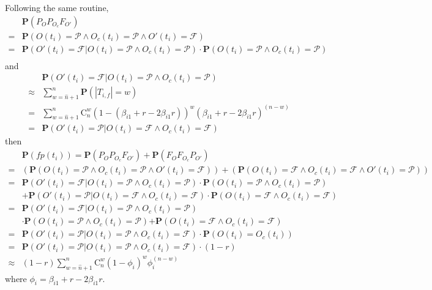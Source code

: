 Following the same routine,
\begin{equation}
\begin{aligned}
& \mathbf{P}(P_O P_{O_c} F_{O'}) \\
= & \mathbf{P}(O(t_i) = \mathcal{P} \wedge O_c(t_i) = \mathcal{P} \wedge O'(t_i) = \mathcal{F}) \\
= & \mathbf{P}(O'(t_i) = \mathcal{F} | O(t_i) = \mathcal{P} \wedge O_c(t_i) = \mathcal{P}) \cdot \mathbf{P}(O(t_i) = \mathcal{P} \wedge O_c(t_i) = \mathcal{P}) \\  
\end{aligned}
\end{equation}
and
\begin{equation}
\begin{aligned}
& \mathbf{P}(O'(t_i) = \mathcal{F} | O(t_i) = \mathcal{P} \wedge O_c(t_i) = \mathcal{P}) \\
\approx & \sum_{w = \hat{n} + 1}^{n}{\mathbf{P}(|T_{i,f}| = w)} \\
= & \sum_{w = \hat{n} + 1}^{n}
{  \mathrm{C}_n^w{(1 - (\beta_{i1} + r - 2\beta_{i1} r))^w}  }
{  (\beta_{i1} + r - 2\beta_{i1} r)^{(n-w)}  } \\
= & \mathbf{P}(O'(t_i) = \mathcal{P} | O(t_i) = \mathcal{F} \wedge O_c(t_i) = \mathcal{F})
\end{aligned}
\end{equation}
then
\begin{equation}
\begin{aligned}
& \mathbf{P}(fp(t_i))= \mathbf{P}(P_O P_{O_c} F_{O'}) + \mathbf{P}(F_O F_{O_c} P_{O'}) \\
= & (\mathbf{P}(O(t_i) = \mathcal{P} \wedge O_c(t_i) = \mathcal{P} \wedge O'(t_i) = \mathcal{F})) 
 + (\mathbf{P}(O(t_i) = \mathcal{F} \wedge O_c(t_i) = \mathcal{F} \wedge O'(t_i) = \mathcal{P})) \\
= & \mathbf{P}(O'(t_i) = \mathcal{F} | O(t_i) = \mathcal{P} \wedge O_c(t_i) = \mathcal{P}) \cdot \mathbf{P}(O(t_i) = \mathcal{P} \wedge O_c(t_i) = \mathcal{P}) \\
& + \mathbf{P}(O'(t_i) = \mathcal{P} | O(t_i) = \mathcal{F} \wedge O_c(t_i) = \mathcal{F}) \cdot \mathbf{P}(O(t_i) = \mathcal{F} \wedge O_c(t_i) = \mathcal{F}) \\
= & \mathbf{P}(O'(t_i) = \mathcal{F} | O(t_i) = \mathcal{P} \wedge O_c(t_i) = \mathcal{P}) \\
& \cdot{\mathbf{P}(O(t_i) = \mathcal{P} \wedge O_c(t_i) = \mathcal{P})}{ +\mathbf{P}(O(t_i) = \mathcal{F} \wedge O_c(t_i) = \mathcal{F})} \\
= & \mathbf{P}(O'(t_i) = \mathcal{P} | O(t_i) = \mathcal{P} \wedge O_c(t_i) = \mathcal{F}) \cdot \mathbf{P}(O(t_i) = O_c(t_i)) \\
= & \mathbf{P}(O'(t_i) = \mathcal{P} | O(t_i) = \mathcal{P} \wedge O_c(t_i) = \mathcal{F}) \cdot (1-r) \\
\approx & (1-r)
\sum_{w = \hat{n} + 1}^{n} \mathrm{C}_n^w{(1 - \phi_i)^w} \phi_i^{(n-w)}
\end{aligned}
\end{equation}
where $\phi_i = \beta_{i1} + r - 2 \beta_{i1} r$.

